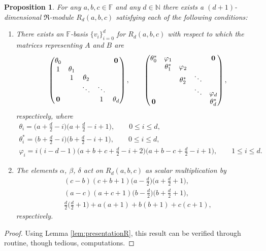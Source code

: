 \documentclass[pdftex]{sigma}
\def\N{\mathbb N}
\def\F{\mathbb F}
\numberwithin{equation}{section}
\newtheorem{Proposition}[Theorem]{Proposition}
 { \theoremstyle{definition}
\newtheorem{Definition}[Theorem]{Definition}
\newtheorem{Example}[Theorem]{Example} }
\begin{document}
\begin{Proposition}\label{prop:Rd}For any $a,b,c\in \F$ and any $d\in \N$ there exists a $(d+1)$-dimensional $\Re$-module $R_d(a,b,c)$ satisfying each of the following conditions:
\begin{enumerate}\itemsep=0pt
\item[$(i)$] There exists an $\F$-basis $\{v_i\}_{i=0}^d$ for $R_d(a,b,c)$ with respect to which the matrices represen\-ting $A$ and $B$ are
\begin{gather*}
\begin{pmatrix}
\theta_0 & & & &{\bf 0}
\\
1 &\theta_1
\\
&1 &\theta_2
 \\
& &\ddots &\ddots
 \\
{\bf 0} & & &1 &\theta_d
\end{pmatrix},
\qquad
\begin{pmatrix}
\theta_0^* &\varphi_1 & & &{\bf 0}
\\
 &\theta_1^* &\varphi_2
\\
 & &\theta_2^* &\ddots
 \\
 & & &\ddots &\varphi_d
 \\
{\bf 0} & & & &\theta_d^*
\end{pmatrix},
\end{gather*}
respectively, where
\begin{gather*}
\theta_i=\big(a+\textstyle\frac{d}{2}-i\big) \big(a+\textstyle\frac{d}{2}-i+1\big), \qquad 0\leq i\leq d,\\
\theta^*_i=\big(b+\textstyle\frac{d}{2}-i\big)\big(b+\textstyle\frac{d}{2}-i+1\big), \qquad 0\leq i\leq d,
\\
\varphi_i=i(i-d-1)\big(a+b+c+\textstyle\frac{d}{2}-i+2\big)\big(a+b-c+\textstyle\frac{d}{2}-i+1\big),
\qquad 1\leq i\leq d.
\end{gather*}

\item[$(ii)$] The elements $\alpha$, $\beta$, $\delta$ act on $R_d (a,b,c)$ as scalar multiplication by
\begin{gather*}
(c-b)(c+b+1)\big(a-\textstyle\frac{d}{2}\big)\big(a+\textstyle\frac{d}{2}+1\big),\\
(a-c)(a+c+1)\big(b-\textstyle\frac{d}{2}\big)\big(b+\textstyle\frac{d}{2}+1\big),\\
\textstyle\frac{d}{2} \big(\textstyle\frac{d}{2}+1\big)+a(a+1)+b(b+1)+c(c+1),
\end{gather*}
respectively.
\end{enumerate}
\end{Proposition}
\begin{proof} Using Lemma \ref{lem:presentationR}, this result can be verified through routine, though tedious, computations.
\end{proof}
\end{document}
